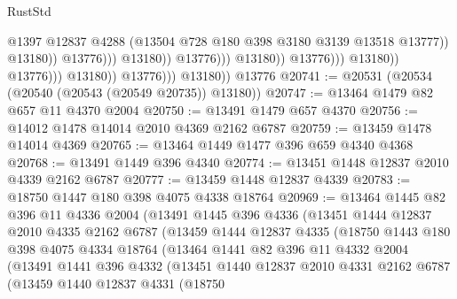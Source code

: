 \begin{lexlean}{RustStd}
\begin{coremodule}
                                                            @1397
                                                            @12837
                                                            @4288
                                                            (@13504
                                                              @728
                                                              @180
                                                              @398
                                                              @3180
                                                              @3139
                                                              @13518
                                                              @13777))
                                                          @13180))
                                                      @13776)))
                                                @13180))
                                            @13776)))
                                      @13180))
                                  @13776)))
                            @13180))
                        @13776)))
                  @13180))
              @13776)))
        @13180))
    @13776
@20741 := @20531 (@20534 (@20540 (@20543 (@20549 @20735)) @13180))
@20747 := @13464 @1479 @82 @657 @11 @4370 @2004
@20750 := @13491 @1479 @657 @4370
@20756 := @14012 @1478 @14014 @2010 @4369 @2162 @6787
@20759 := @13459 @1478 @14014 @4369
@20765 := @13464 @1449 @1477 @396 @659 @4340 @4368
@20768 := @13491 @1449 @396 @4340
@20774 := @13451 @1448 @12837 @2010 @4339 @2162 @6787
@20777 := @13459 @1448 @12837 @4339
@20783 := @18750 @1447 @180 @398 @4075 @4338 @18764
@20969 := @13464
    @1445
    @82
    @396
    @11
    @4336
    @2004
    (@13491
      @1445
      @396
      @4336
      (@13451
        @1444
        @12837
        @2010
        @4335
        @2162
        @6787
        (@13459
          @1444
          @12837
          @4335
          (@18750
            @1443
            @180
            @398
            @4075
            @4334
            @18764
            (@13464
              @1441
              @82
              @396
              @11
              @4332
              @2004
              (@13491
                @1441
                @396
                @4332
                (@13451
                  @1440
                  @12837
                  @2010
                  @4331
                  @2162
                  @6787
                  (@13459
                    @1440
                    @12837
                    @4331
                    (@18750

\end{coremodule}
\end{lexlean}
